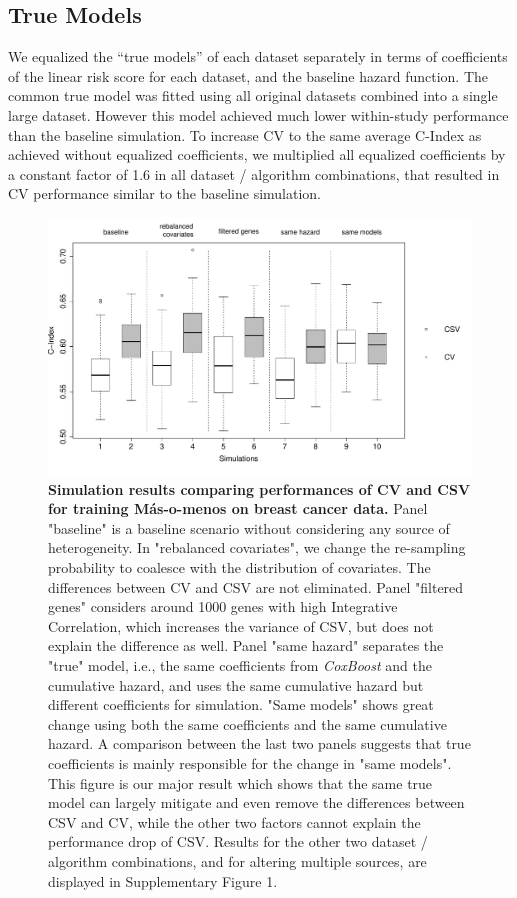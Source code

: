 \documentclass{bioinfo}
\begin{document}
  \subsection{True Models}
  We equalized the ``true models'' of each dataset separately in terms
  of coefficients of the linear risk score for each dataset, and
  the baseline hazard function.  The common true model was fitted using
  all original datasets combined into a single large dataset.  However
  this model achieved much lower within-study performance than the
  baseline simulation. To increase CV to the same average C-Index as achieved without
  equalized coefficients, we multiplied all equalized coefficients
  by a constant factor of 1.6 in all dataset / algorithm combinations, that resulted 
  in CV performance similar
  to the baseline simulation.%


  

 \begin{figure}[htp]
     \centering
     \includegraphics[width=16cm]{boxplot_breast_masomenos_5panels.pdf}
     \caption{\textbf{Simulation results comparing performances of CV and CSV for training M\'{a}s-o-menos on breast cancer data.} Panel "baseline" is a baseline scenario without considering any source of heterogeneity. In "rebalanced covariates", we change the re-sampling probability to coalesce with the distribution of covariates. The differences between CV and CSV are not eliminated. Panel "filtered genes" considers around 1000 genes with high Integrative Correlation, which increases the variance of CSV, but does not explain the difference as well. Panel "same hazard" separates the "true" model, i.e., the same coefficients from \emph{CoxBoost} and the cumulative hazard, and uses the same cumulative hazard but different coefficients for simulation. "Same models" shows great change using both the same coefficients and the same cumulative hazard. A comparison between the last two panels suggests that true coefficients is mainly responsible for the change in "same models". This figure is our major result which shows that the same true model can largely mitigate and even remove the differences between CSV and CV, while the other two factors cannot explain the performance drop of CSV. Results for the other two dataset / algorithm combinations, and for altering multiple sources, are displayed in Supplementary Figure 1.}
     \label{boxplot_breast_masomenos}
 \end{figure}
\end{document}

